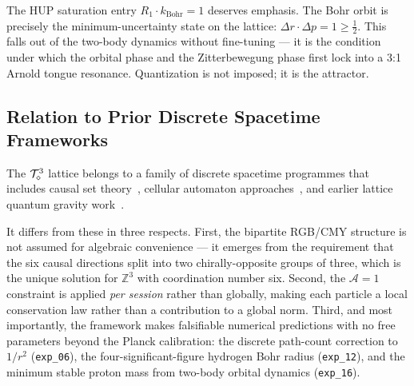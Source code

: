 \medskip
The HUP saturation entry $R_1 \cdot k_\text{Bohr} = 1$ deserves emphasis.
The Bohr orbit is precisely the minimum-uncertainty state on the lattice:
$\Delta r \cdot \Delta p = 1 \geq \tfrac{1}{2}$.
This falls out of the two-body dynamics without fine-tuning --- it is
the condition under which the orbital phase and the Zitterbewegung phase
first lock into a 3:1 Arnold tongue resonance.
Quantization is not imposed; it is the attractor.

\begin{figure}[htbp]
    \centering
    
    \label{fig:diamond_grid_units}
\end{figure}

\subsection{Relation to Prior Discrete Spacetime Frameworks}
\label{subsec:prior_work}

The $\mathcal{T}_\diamond^3$ lattice belongs to a family of discrete spacetime
programmes that includes causal set theory~\cite{bombelli1987},
cellular automaton approaches~\cite{wolfram2002,thooft2016},
and earlier lattice quantum gravity work~\cite{zuse1969,wheeler1990}.

It differs from these in three respects.
First, the bipartite RGB/CMY structure is not assumed for algebraic
convenience --- it emerges from the requirement that the six causal
directions split into two chirally-opposite groups of three, which is
the unique solution for $\mathbb{Z}^3$ with coordination number six.
Second, the $\mathcal{A}=1$ constraint is applied \emph{per session}
rather than globally, making each particle a local conservation law
rather than a contribution to a global norm.
Third, and most importantly, the framework makes falsifiable numerical
predictions with no free parameters beyond the Planck calibration:
the discrete path-count correction to $1/r^2$ (\texttt{exp\_06}),
the four-significant-figure hydrogen Bohr radius (\texttt{exp\_12}),
and the minimum stable proton mass from two-body orbital dynamics
(\texttt{exp\_16}).
